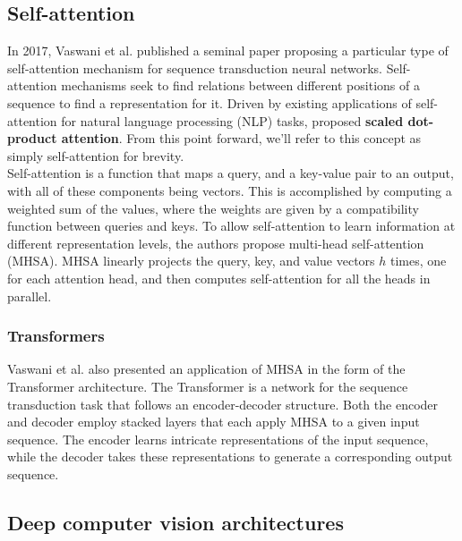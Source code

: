 \documentclass[../main.tex]{subfiles}
\begin{document}
\subsection{Self-attention}

In 2017, Vaswani et al. \cite{vaswani2017selfatt} published a seminal paper proposing a particular type of self-attention mechanism for sequence transduction neural networks.
Self-attention mechanisms seek to find relations between different positions of a sequence to find a representation for it.
Driven by  existing applications of self-attention for natural language processing (NLP) tasks, \cite{vaswani2017selfatt} proposed \textbf{scaled dot-product attention}.
From this point forward, we'll refer to this concept as simply self-attention for brevity.\\

Self-attention \cite{vaswani2017selfatt} is a function that maps a query, and a key-value pair to an output, with all of these components being vectors.
This is accomplished by computing a weighted sum of the values, where the weights are given by a compatibility function between queries and keys.
To allow self-attention to learn information at different representation levels, the authors propose multi-head self-attention (MHSA).
MHSA linearly projects the query, key, and value vectors $h$ times, one for each attention head, and then computes self-attention for all the heads in parallel.

\subsubsection{Transformers}

Vaswani et al. \cite{vaswani2017selfatt} also presented an application of MHSA in the form of the Transformer architecture.
The Transformer is a network for the sequence transduction task that follows an encoder-decoder structure.
Both the encoder and decoder employ stacked layers that each apply MHSA to a given input sequence.
The encoder learns intricate representations of the input sequence, while the decoder takes these representations to generate a corresponding output sequence.

\subsection{Deep computer vision architectures}
\end{document}
